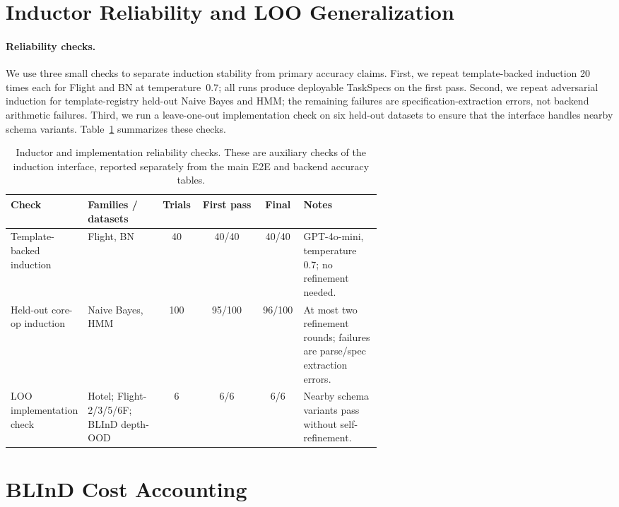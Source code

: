 \documentclass{article}
\newcommand{\taskspec}{TaskSpec}
\begin{document}
\section{Inductor Reliability and LOO Generalization}
\label{app:reliability}

\paragraph{Reliability checks.}
We use three small checks to separate induction stability from primary accuracy claims.
First, we repeat template-backed induction 20 times each for Flight and BN at temperature~0.7; all runs produce deployable \taskspec{}s on the first pass.
Second, we repeat adversarial induction for template-registry held-out Naive Bayes and HMM; the remaining failures are specification-extraction errors, not backend arithmetic failures.
Third, we run a leave-one-out implementation check on six held-out datasets to ensure that the interface handles nearby schema variants.
Table~\ref{tab:reliability_summary} summarizes these checks.

\begin{table}[ht]
\centering
\scriptsize
\setlength{\tabcolsep}{3pt}
\caption{Inductor and implementation reliability checks. These are auxiliary checks of the induction interface, reported separately from the main E2E and backend accuracy tables.}
\label{tab:reliability_summary}
\begin{tabular}{@{}p{0.20\linewidth}p{0.20\linewidth}ccc p{0.21\linewidth}@{}}
\toprule
Check & Families / datasets & Trials & First pass & Final & Notes \\
\midrule
Template-backed induction & Flight, BN & 40 & 40/40 & 40/40 & GPT-4o-mini, temperature 0.7; no refinement needed. \\
Held-out core-op induction & Naive Bayes, HMM & 100 & 95/100 & 96/100 & At most two refinement rounds; failures are parse/spec extraction errors. \\
LOO implementation check & Hotel; Flight-2/3/5/6F; BLInD depth-OOD & 6 & 6/6 & 6/6 & Nearby schema variants pass without self-refinement. \\
\bottomrule
\end{tabular}
\end{table}

\section{BLInD Cost Accounting}
\label{app:cost}
\end{document}
